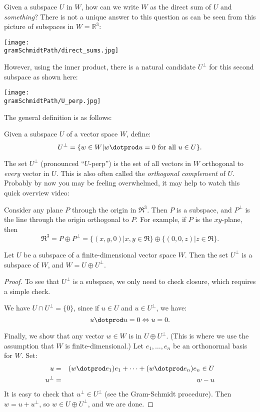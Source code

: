 Given a subspace $U$ in $W$, how can we write $W$ as the direct sum of $U$ and \emph{something}? There is not a unique answer to this question as can be seen from this picture of subspaces in $W={\mathbb R}^3$: 
\begin{center}
\texttt{[image: \\gramSchmidtPath/direct\_sums.jpg]}
\end{center}
However, using the inner product, there is a natural candidate $U^\perp$ for this second subspace as shown here:
\begin{center}
\texttt{[image: \\gramSchmidtPath/U\_perp.jpg]}
\end{center}

The general definition is as follows:
\begin{definition}
Given a subspace $U$ of a vector space $W$, define:
\[
U^\perp = \{w\in W | w\dotprod u=0 \text{ for all } u\in U\}.
\]
\end{definition}

The set $U^\perp$ (pronounced ``$U$-perp'') is the set of all vectors in $W$ orthogonal to \emph{every} vector in $U$.  This is also often called the \emph{orthogonal complement} of $U$. Probably by now you may be feeling overwhelmed, it may help to watch this quick overview video:




\begin{example}
Consider any plane $P$ through the origin in $\Re^3$.  Then $P$ is a subspace, and $P^\perp$ is the line through the origin orthogonal to $P$.  For example, if $P$ is the $xy$-plane, then
\[
\Re^3=P\oplus P^\perp=\{(x,y,0)| x,y\in \Re \} \oplus \{(0,0,z)| z\in \Re \}.
\]
\end{example}

\begin{theorem}
Let $U$ be a subspace of a finite-dimensional vector space $W$.  Then the set $U^\perp$ is a subspace of $W$, and $W=U\oplus U^\perp$.
\end{theorem}

\begin{proof}
To see that $U^\perp$ is a subspace, we only need to check closure, which requires a simple check.

We have $U\cap U^\perp=\{0\}$, since if $u\in U$ and $u\in U^\perp$, we have:
\[
u\dotprod u = 0 \Leftrightarrow u=0.
\]

Finally, we show that any vector $w\in W$ is in $U\oplus U^\perp$.  (This is where we use the assumption that $W$ is finite-dimensional.)  Let $e_1, \ldots, e_n$ be an orthonormal basis for $W$.  Set: 
\begin{eqnarray*}
u&=&(w\dotprod e_1)e_1 + \cdots + (w\dotprod e_n)e_n \in U\\
u^\perp&=& w-u
\end{eqnarray*}
It is easy to check that $u^\perp \in U^\perp$ (see the Gram-Schmidt procedure).  Then $w=u+u^\perp$, so $w\in U\oplus U^\perp$, and we are done.
\end{proof}

